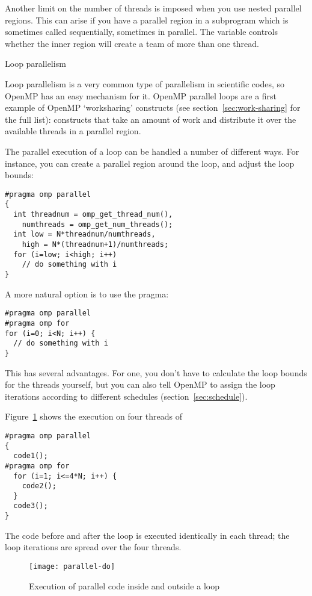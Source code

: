 Another limit on the number of threads is imposed when you use nested parallel regions.
This can arise if you have a parallel region in a subprogram which is sometimes called
sequentially, sometimes in parallel. The variable  controls
whether the inner region will create a team of more than one thread.

 {Loop parallelism}

Loop parallelism is a very common type of parallelism in scientific
codes, so OpenMP has an easy mechanism for it.
OpenMP parallel loops are a first example of OpenMP `worksharing'
constructs (see section~\ref{sec:work-sharing} for the full list):
constructs that take an amount of work and distribute it over the
available threads in a parallel region.

The parallel execution of a loop can be handled a number of different ways.
For instance, you can create a parallel region around the loop, and
adjust the loop bounds:
\begin{verbatim}
#pragma omp parallel
{
  int threadnum = omp_get_thread_num(),
    numthreads = omp_get_num_threads();
  int low = N*threadnum/numthreads,
    high = N*(threadnum+1)/numthreads;
  for (i=low; i<high; i++)
    // do something with i
}
\end{verbatim}

A more natural option is to use the
 pragma:
\begin{verbatim}
#pragma omp parallel
#pragma omp for
for (i=0; i<N; i++) {
  // do something with i
}
\end{verbatim}
This has several advantages. For one, you don't have to calculate the loop bounds
for the threads yourself, but you can also tell OpenMP to assign the loop
iterations according to different schedules (section~\ref{sec:schedule}).

Figure~\ref{fig:omp-par-do} shows the execution on four threads of
\begin{verbatim}
#pragma omp parallel
{
  code1();
#pragma omp for
  for (i=1; i<=4*N; i++) {
    code2();
  }
  code3();
}
\end{verbatim}
The code before and after the loop is executed identically
in each thread; the loop iterations are spread over the four threads.
\begin{figure}[ht]
  \texttt{[image: parallel-do]}
  \caption{Execution of parallel code inside and outside a loop}
  \label{fig:omp-par-do}
\end{figure}

